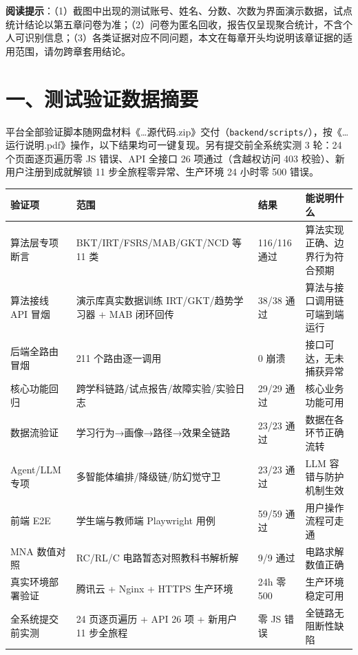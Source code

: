 \documentclass[zihao=-4,a4paper,UTF8,fontset=windows]{ctexart}
\begin{document}
\textbf{阅读提示}：（1）截图中出现的测试账号、姓名、分数、次数为界面演示数据，试点统计结论以第五章问卷为准；（2）问卷为匿名回收，报告仅呈现聚合统计，不含个人可识别信息；（3）各类证据对应不同问题，本文在每章开头均说明该章证据的适用范围，请勿跨章套用结论。

\section{一、测试验证数据摘要}

平台全部验证脚本随网盘材料《\dots{}源代码.zip》交付（\texttt{backend/scripts/}），按《\dots{}运行说明.pdf》操作，以下结果均可一键复现。另有提交前全系统实测 3 轮：24 个页面逐页遍历零 JS 错误、API 全接口 26 项通过（含越权访问 403 校验）、新用户注册到成就解锁 11 步全旅程零异常、生产环境 24 小时零 500 错误。

{\setlength{\tabcolsep}{3pt}
\par\noindent\begin{tabular}{|p{2.2cm}|p{4.6cm}|p{2.0cm}|p{4.8cm}|}
\hline
\textbf{验证项} & \textbf{范围} & \textbf{结果} & \textbf{能说明什么} \\ \hline
算法层专项断言 & BKT/IRT/FSRS/MAB/GKT/NCD 等 11 类 & 116/116 通过 & 算法实现正确、边界行为符合预期 \\ \hline
算法接线 API 冒烟 & 演示库真实数据训练 IRT/GKT/趋势学习器 + MAB 闭环回传 & 38/38 通过 & 算法与接口调用链可端到端运行 \\ \hline
后端全路由冒烟 & 211 个路由逐一调用 & 0 崩溃 & 接口可达，无未捕获异常 \\ \hline
核心功能回归 & 跨学科链路/试点报告/故障实验/实验日志 & 29/29 通过 & 核心业务功能可用 \\ \hline
数据流验证 & 学习行为→画像→路径→效果全链路 & 23/23 通过 & 数据在各环节正确流转 \\ \hline
Agent/LLM 专项 & 多智能体编排/降级链/防幻觉守卫 & 23/23 通过 & LLM 容错与防护机制生效 \\ \hline
前端 E2E & 学生端与教师端 Playwright 用例 & 59/59 通过 & 用户操作流程可走通 \\ \hline
MNA 数值对照 & RC/RL/C 电路暂态对照教科书解析解 & 9/9 通过 & 电路求解数值正确 \\ \hline
真实环境部署验证 & 腾讯云 + Nginx + HTTPS 生产环境 & 24h 零 500 & 生产环境稳定可用 \\ \hline
全系统提交前实测 & 24 页逐页遍历 + API 26 项 + 新用户 11 步全旅程 & 零 JS 错误 & 全链路无阻断性缺陷 \\ \hline
\end{tabular}\par}
\end{document}
